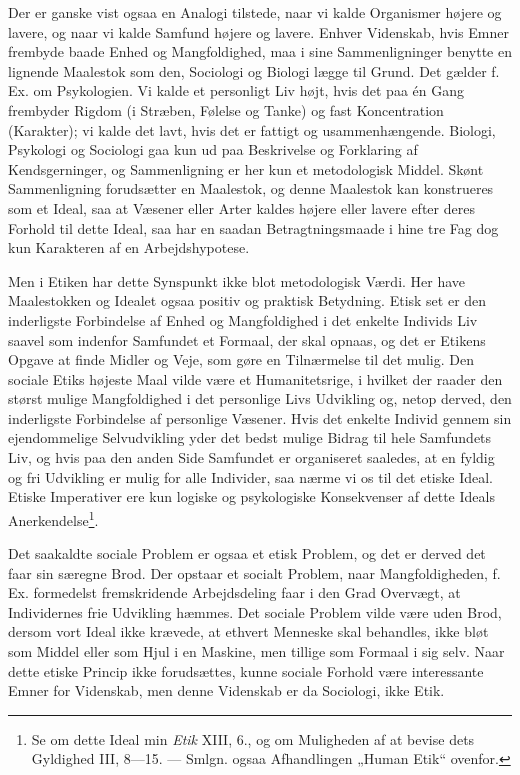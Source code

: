 \documentclass[12pt,a4paper,openany]{book}
\newcommand{\opage}[1]{\marginnote{\footnotesize\textit{[#1]}}}
\begin{document}
Der er ganske vist ogsaa en Analogi tilstede, naar vi kalde
Organismer højere og lavere, og naar vi kalde Samfund højere
og lavere. Enhver Videnskab, hvis Emner frembyde baade
Enhed og Mangfoldighed, maa i sine Sammenligninger benytte
en lignende Maalestok som den, Sociologi og Biologi lægge til
Grund. Det gælder f. Ex. om Psykologien. Vi kalde et personligt
Liv højt, hvis det paa én Gang frembyder Rigdom (i
Stræben, Følelse og Tanke) og fast Koncentration (Karakter);
vi kalde det lavt, hvis det er fattigt og usammenhængende.
Biologi, Psykologi og Sociologi gaa kun ud paa Beskrivelse og
Forklaring af Kendsgerninger, og Sammenligning er her kun et
metodologisk Middel. Skønt Sammenligning forudsætter en
Maalestok, og denne Maalestok kan konstrueres som et Ideal,
saa at Væsener eller Arter kaldes højere eller lavere efter
deres Forhold til dette Ideal, saa har en saadan Betragtningsmaade
i hine tre Fag dog kun Karakteren af en Arbejdshypotese.


Men i Etiken har dette Synspunkt ikke blot metodologisk
Værdi. Her have Maalestokken og Idealet ogsaa positiv og
praktisk Betydning. Etisk set er den inderligste Forbindelse
\setcounter{footnote}{0}%
\opage{74}af Enhed og Mangfoldighed i det enkelte Individs Liv saavel
som indenfor Samfundet et Formaal, der skal opnaas, og det er
Etikens Opgave at finde Midler og Veje, som gøre en Tilnærmelse
til det mulig. Den sociale Etiks højeste Maal vilde være
et Humanitetsrige, i hvilket der raader den størst mulige Mangfoldighed
i det personlige Livs Udvikling og, netop derved, den
inderligste Forbindelse af personlige Væsener. Hvis det enkelte
Individ gennem sin ejendommelige Selvudvikling yder det bedst
mulige Bidrag til hele Samfundets Liv, og hvis paa den anden
Side Samfundet er organiseret saaledes, at en fyldig og fri
Udvikling er mulig for alle Individer, saa nærme vi os til det
etiske Ideal. Etiske Imperativer ere kun logiske og psykologiske
Konsekvenser af dette Ideals Anerkendelse\footnote[1]{Se om dette Ideal min \textit{Etik} XIII, 6., og om Muligheden af at bevise dets Gyldighed III, 8---15. --- Smlgn. ogsaa Afhandlingen „Human Etik“ ovenfor.}.

Det saakaldte sociale Problem er ogsaa et etisk Problem,
og det er derved det faar sin særegne Brod. Der opstaar et
socialt Problem, naar Mangfoldigheden, f. Ex. formedelst fremskridende
Arbejdsdeling faar i den Grad Overvægt, at Individernes
frie Udvikling hæmmes. Det sociale Problem vilde
være uden Brod, dersom vort Ideal ikke krævede, at ethvert
Menneske skal behandles, ikke bløt som Middel eller som Hjul i
en Maskine, men tillige som Formaal i sig selv. Naar dette
etiske Princip ikke forudsættes, kunne sociale Forhold være
interessante Emner for Videnskab, men denne Videnskab er da
Sociologi, ikke Etik.
\end{document}
